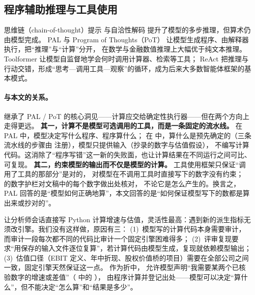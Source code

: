 \subsection{程序辅助推理与工具使用}
\label{sec:rel-tools}

思维链（chain-of-thought）提示\cite{wei2022cot} 与自洽性解码\cite{wang2023selfconsistency} 提升了模型的多步推理，但算术仍由模型完成。
PAL\cite{gao2023pal} 与 Program of Thoughts（PoT）\cite{chen2023pot} 让模型生成程序、由解释器执行，把“推理”与“计算”分开，
在数学与金融数值推理上大幅优于纯文本推理。Toolformer\cite{schick2023toolformer} 让模型自监督地学会何时调用计算器、检索等工具；
ReAct\cite{yao2023react} 把推理与行动交错，形成“思考—调用工具—观察”的循环，成为后来大多数智能体框架的基本模式。

\paragraph{与本文的关系。}
\sysname{} 继承了 PAL / PoT 的核心洞见——计算应交给确定性执行器——但在两个方向上走得更远。
\textbf{其一，计算不是模型可选调用的工具，而是一条固定的流水线。} 在 PAL 中，模型决定写什么程序、程序算什么；
在 \sysname{} 中，算什么是预先确定的（三条流水线的步骤由  注册），模型只提供输入（抄录的数字与估值假设），
不编写计算代码。这消除了“程序写错”这一新的失败面，也让计算结果在不同运行之间可比、可复现。
\textbf{其二，约束模型的输出而不仅是模型的计算。} 工具使用框架只保证“调用了工具的那部分”是对的，
对模型在不调用工具时直接写下的数字没有约束；\sysname{} 的数字护栏对文稿中的每个数字做出处核对，
不论它是怎么产生的。换言之，PAL 回答的是“模型如何正确地算”，本文回答的是“如何保证模型写下的数都是算出来或抄对的”。

\begin{tradeoff}
让分析师会话直接写 Python 计算增速与估值，灵活性最高：遇到新的派生指标无须改引擎。我们没有这样做，原因有三：
(1)~模型写的计算代码本身需要审计，而审计一段每次都不同的代码比审计一个固定引擎困难得多；
(2)~评审复现要求“用保存的输入文件逐位复算”，若计算代码由模型生成，复现就依赖模型输出；
(3)~估值口径（EBIT 定义、年中折现、股权价值桥的项目）需要在全部公司之间一致，固定引擎天然保证这一点。
作为折中， 允许模型声明“我需要某两个已核验数字的增速或差值”（ 中的 ），
由程序计算并登记出处——模型可以决定“算什么”，但不能决定“怎么算”和“结果是多少”。
\end{tradeoff}

